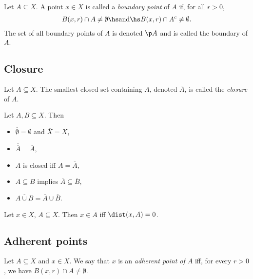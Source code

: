 \documentclass{article}
\begin{document}
\begin{definition}
    Let $A\subseteq X$. A point $x\in X$ is called a \emph{boundary point} of $A$ if, for all 
    $r>0$,
    \begin{align*}
        B(x,r)\cap A\not=\emptyset\hs\text{and}\hs B(x,r)\cap A^c\not=\emptyset.
    \end{align*}
    The set of all boundary points of $A$ is denoted $\p A$ and is called the boundary of $A$.
\end{definition}

\subsection{Closure}

\begin{definition}
    Let $A\subseteq X$. The smallest closed set containing $A$, denoted $\overline A$, is called
    the \emph{closure} of $A$.
\end{definition}

\begin{proposition}[Notes 4.26]
    Let $A,B\subseteq X$. Then
    \begin{itemize}
        \item $\overline\emptyset = \emptyset$ and $\overline X = X$,
        \item $\overline{\overline A} = \overline A$,
        \item $A$ is closed iff $A=\overline A$,
        \item $A\subseteq B$ implies $\overline A\subseteq\overline B$,
        \item $\overline{A\cup B} = \overline A \cup \overline B$.
    \end{itemize}
\end{proposition}

\begin{theorem}
    Let $x\in X$, $A\subseteq X$. Then $x\in\overline A$ iff $\dist(x,A)=0$.
\end{theorem}

\subsection{Adherent points}

\begin{definition}[Notes 4.27]
    Let $A\subseteq X$ and $x\in X$. We say that $x$ is an \emph{adherent point of $A$}
    iff, for every $r>0$, we have $B(x,r)\cap A\not=\emptyset$.
\end{definition}
\end{document}
